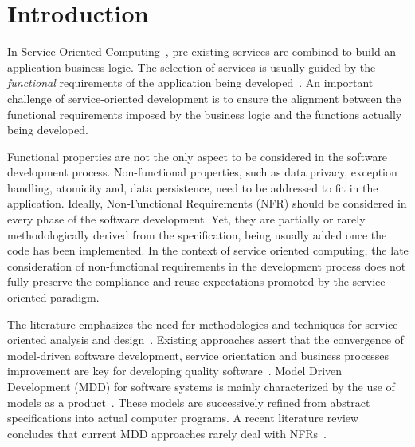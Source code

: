 \documentclass{singlecol-new}
\theoremstyle{TH}{
\newtheorem{lemma}{Lemma}
\newtheorem{theorem}[lemma]{Theorem}
\newtheorem{corrolary}[lemma]{Corrolary}
\newtheorem{conjecture}[lemma]{Conjecture}
\newtheorem{proposition}[lemma]{Proposition}
\newtheorem{claim}[lemma]{Claim}
\newtheorem{stheorem}[lemma]{Wrong Theorem}
\newtheorem{algorithm}{Algorithm}
}
\theoremstyle{THrm}{
\newtheorem{definition}{Definition}[section]
\newtheorem{question}{Question}[section]
\newtheorem{remark}{Remark}
\newtheorem{scheme}{Scheme}
}
\theoremstyle{THhit}{
\newtheorem{case}{Case}[section]
}
\theoremstyle{THhsl}{
\newtheorem{example}{Example}
}
\begin{document}
\section{Introduction}
\label{sec:intro}

In Service-Oriented Computing~\cite{Papazoglou2007}, pre-ex\-isting services are
combined to build an application business logic.
The selection of services is usually guided by the \textit{functional}\footnotemark {} requirements of the application being developed~\cite{2,decastro1,PapazoglouH06}.
An important challenge of service-o\-rien\-ted development is  to ensure the alignment between the functional requirements imposed by the business logic and the functions actually being developed.

Functional properties are not the only aspect to be considered in the software development process.
Non-functional properties, such as data privacy, exception handling, atomicity  and, data persistence, need to be addressed to fit in the application.
Ideally, Non-Functional Requirements (NFR) should be considered in every phase of the software development.
Yet, they are partially or rarely methodologically derived from the specification, being usually added once the code has been im\-ple\-men\-ted.
In the context of service oriented computing, the late consideration of non-functional requirements in the development process does not fully preserve the compliance and re\-use expectations promoted by the service oriented paradigm.

The literature emphasizes the need for meth\-od\-ol\-o\-gies and techniques for service oriented analysis and design~\cite{Papazoglou2007}.
Existing approaches assert that the convergence of model-driven soft\-ware development, service orientation  and  busi\-ness processes improvement are key for developing quality software~\cite{watson}.
Model Driven Development (MDD)  for software systems is mainly characterized by the use of models as a product~\cite{Selic03}.
These models are successively refined from abstract specifications into actual computer programs. 
A recent literature review  concludes that current MDD approaches rarely deal with NFRs~\cite{Ameller201542}\footnotemark {}.
\end{document}
